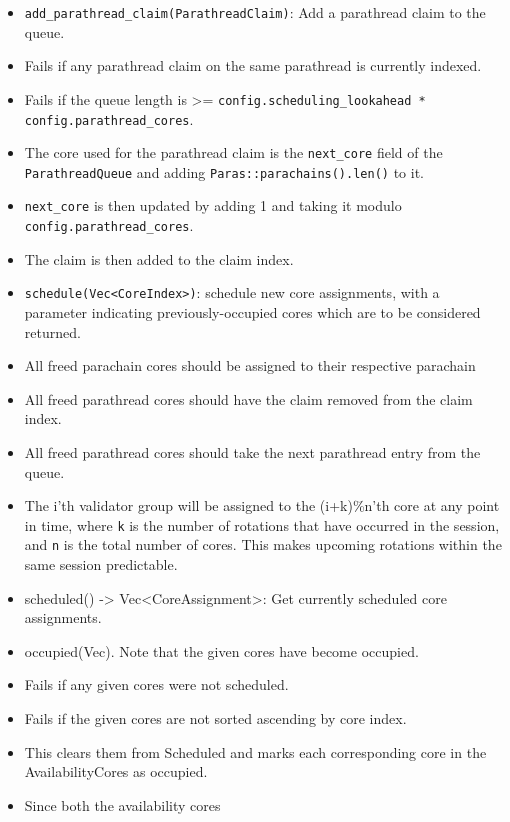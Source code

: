 \begin{itemize}
    \item \verb|add_parathread_claim(ParathreadClaim)|: Add a parathread claim to the
    queue.
    \item Fails if any parathread claim on the same parathread is
    currently indexed.
    \item Fails if the queue length is >=
    \verb|config.scheduling_lookahead * config.parathread_cores|.
    \item The core
    used for the parathread claim is the \verb|next_core| field of the \verb|ParathreadQueue|
    and adding \verb|Paras::parachains().len()| to it.
    \item \verb|next_core| is then
    updated by adding 1 and taking it modulo \verb|config.parathread_cores|.
    \item The claim is then added to the claim index.
    \item \verb|schedule(Vec<CoreIndex>)|: schedule new core assignments, with a
    parameter indicating previously-occupied cores which are to be considered
    returned.
    \item All freed parachain cores should be assigned to their
    respective parachain
    \item All freed parathread cores should have the
    claim removed from the claim index.
    \item All freed parathread cores
    should take the next parathread entry from the queue.
    \item The i'th
    validator group will be assigned to the (i+k)\%n'th core at any point in
    time, where \verb|k| is the number of rotations that have occurred in the session,
    and \verb|n| is the total number of cores. This makes upcoming rotations within the
    same session predictable. 
    \item scheduled() -> Vec<CoreAssignment>: Get currently scheduled core
    assignments.
    \item occupied(Vec). Note that the given cores have become occupied.
    \item Fails if any given cores were not scheduled.
    \item Fails if the
    given cores are not sorted ascending by core index.
    \item This clears
    them from Scheduled and marks each corresponding core in the
    AvailabilityCores as occupied.
    \item Since both the availability cores

\end{itemize}
